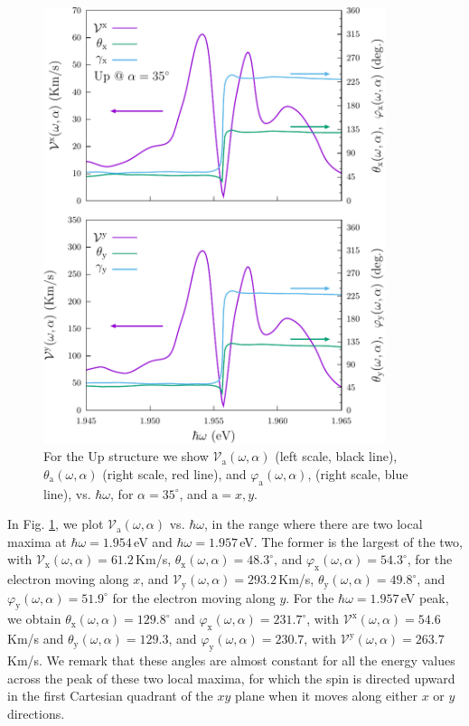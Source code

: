 \documentclass[floatfix,prb,aps,superscriptaddress,showpacs,11pt,preprint,letterpaper]{revtex4}
\def\tama{10cm}
\begin{document}
\begin{figure}[t]
\centering
\includegraphics[width=\tama]{figures/fig8}
\caption{For the Up structure we show $\mathcal{V}_{\mathrm{a}}
(\omega,\alpha)$ (left scale, black line), $\theta_{\mathrm{a}}
(\omega,\alpha)$ (right scale, red line), and $\varphi_{\mathrm{a}}
(\omega,\alpha)$, (right scale, blue line), vs. $\hbar\omega$, for
$\alpha=35^\circ$, and $\mathrm{a}=x,y$. }
\label{fig:up-vx-vy-w2}
\end{figure}
In Fig. \ref{fig:up-vx-vy-w2}, we plot $\mathcal{V}_{\mathrm{a}}
(\omega,\alpha)$ vs. $\hbar\omega$, in the range where there are two local
maxima at $\hbar\omega=1.954$\,eV and $\hbar\omega=1.957$\,eV. The former is the
largest of the two, with $\mathcal{V}_{\mathrm{x}} (\omega,\alpha)=61.2$\,Km/s,
$\theta_{\mathrm{x}} (\omega,\alpha)=48.3^{\circ}$, and $\varphi_{\mathrm{x}}
(\omega,\alpha)=54.3^{\circ}$, for the electron moving along $x$, and
$\mathcal{V}_{\mathrm{y}} (\omega,\alpha)=293.2$\,Km/s, $\theta_{\mathrm{y}}
(\omega,\alpha) = 49.8^{\circ}$, and $\varphi_{\mathrm{y}} (\omega,\alpha) =
51.9^{\circ}$ for the electron moving along $y$. For the $\hbar\omega=1.957$\,eV
peak, we obtain $\theta_{\mathrm{x}} (\omega,\alpha) = 129.8^{\circ}$ and
$\varphi_{\mathrm{x}} (\omega,\alpha) = 231.7^{\circ}$, with
$\mathcal{V}^{\mathrm{x}} (\omega,\alpha) = 54.6$\,Km/s and $\theta_{\mathrm{y}}
(\omega,\alpha) = 129.3$, and $\varphi_{\mathrm{y}} (\omega,\alpha) = 230.7$,
with $\mathcal{V}^{\mathrm{y}} (\omega,\alpha) = 263.7$\,Km/s. We remark that
these angles are almost constant for all the energy values across the peak of
these two local maxima, for which the spin is directed upward in the first
Cartesian quadrant of the $xy$ plane when it moves along either $x$ or $y$
directions.
\end{document}
